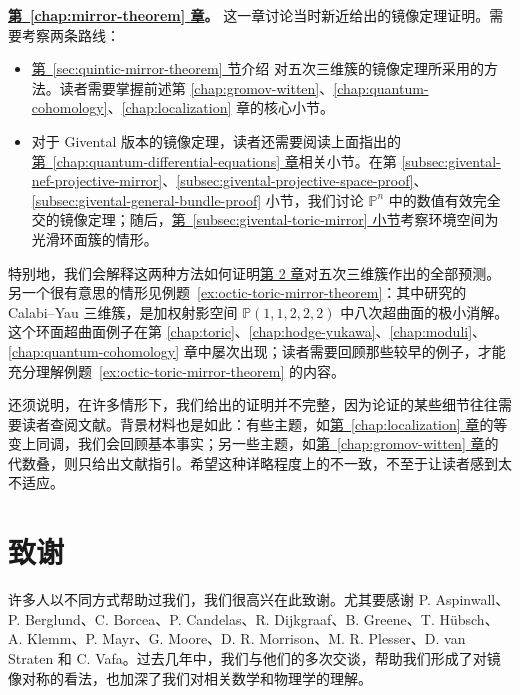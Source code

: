 \noindent\textbf{\hyperref[chap:mirror-theorem]{第~\ref*{chap:mirror-theorem} 章}。} 这一章讨论当时新近给出的镜像定理证明。需要考察两条路线：
\begin{itemize}
\item \hyperref[sec:quintic-mirror-theorem]{第~\ref*{sec:quintic-mirror-theorem} 节}介绍  对五次三维簇的镜像定理所采用的方法。读者需要掌握前述第 \hyperref[chap:gromov-witten]{\ref*{chap:gromov-witten}}、\hyperref[chap:quantum-cohomology]{\ref*{chap:quantum-cohomology}}、\hyperref[chap:localization]{\ref*{chap:localization}} 章的核心小节。
\item 对于 Givental 版本的镜像定理，读者还需要阅读上面指出的\hyperref[chap:quantum-differential-equations]{第~\ref*{chap:quantum-differential-equations} 章}相关小节。在第 \hyperref[subsec:givental-nef-projective-mirror]{\ref*{subsec:givental-nef-projective-mirror}}、\hyperref[subsec:givental-projective-space-proof]{\ref*{subsec:givental-projective-space-proof}}、\hyperref[subsec:givental-general-bundle-proof]{\ref*{subsec:givental-general-bundle-proof}} 小节，我们讨论 $\mathbb P^n$ 中的数值有效完全交的镜像定理；随后，\hyperref[subsec:givental-toric-mirror]{第~\ref*{subsec:givental-toric-mirror} 小节}考察环境空间为光滑环面簇的情形。
\end{itemize}
特别地，我们会解释这两种方法如何证明\hyperref[chap:quintic]{第 2 章}对五次三维簇作出的全部预测。另一个很有意思的情形见例题~\ref{ex:octic-toric-mirror-theorem}：其中研究的 Calabi--Yau 三维簇，是加权射影空间 $\mathbb P(1,1,2,2,2)$ 中八次超曲面的极小消解。这个环面超曲面例子在第 \hyperref[chap:toric]{\ref*{chap:toric}}、\hyperref[chap:hodge-yukawa]{\ref*{chap:hodge-yukawa}}、\hyperref[chap:moduli]{\ref*{chap:moduli}}、\hyperref[chap:quantum-cohomology]{\ref*{chap:quantum-cohomology}} 章中屡次出现；读者需要回顾那些较早的例子，才能充分理解例题~\ref{ex:octic-toric-mirror-theorem} 的内容。

还须说明，在许多情形下，我们给出的证明并不完整，因为论证的某些细节往往需要读者查阅文献。背景材料也是如此：有些主题，如\hyperref[chap:localization]{第~\ref*{chap:localization} 章}的等变上同调，我们会回顾基本事实；另一些主题，如\hyperref[chap:gromov-witten]{第~\ref*{chap:gromov-witten} 章}的代数叠，则只给出文献指引。希望这种详略程度上的不一致，不至于让读者感到太不适应。

\begingroup\linespread{1.22}\selectfont
\section*{致谢}
许多人以不同方式帮助过我们，我们很高兴在此致谢。尤其要感谢 P. Aspinwall、P. Berglund、C. Borcea、P. Candelas、R. Dijkgraaf、B. Greene、T. Hübsch、A. Klemm、P. Mayr、G. Moore、D. R. Morrison、M. R. Plesser、D. van Straten 和 C. Vafa。过去几年中，我们与他们的多次交谈，帮助我们形成了对镜像对称的看法，也加深了我们对相关数学和物理学的理解。

